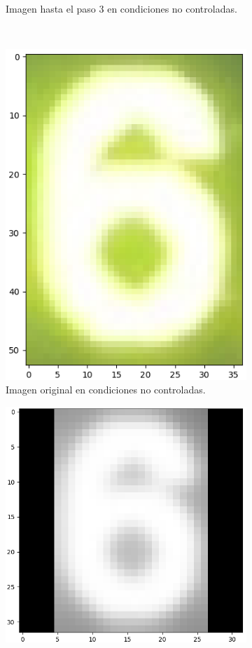 \begin{figure}[hp!]
\begin{subfigure}[t]{0.3\textwidth}
        \caption{Imagen hasta el paso 3 en condiciones no controladas.}
    \end{subfigure}
    \\[+1em]
    \begin{subfigure}[t]{0.3\textwidth}
        \centering
        \includegraphics[height=\x1cm]{3_Reconocimiento/Figs/test_sample6_bad_original2}
        \caption{Imagen original en condiciones no controladas.}
    \end{subfigure}
    \hfill
    \begin{subfigure}[t]{0.3\textwidth}
        \centering
        \includegraphics[height=\x1cm]{3_Reconocimiento/Figs/test_sample6_bad_padded2}

\end{subfigure}
\end{figure}
